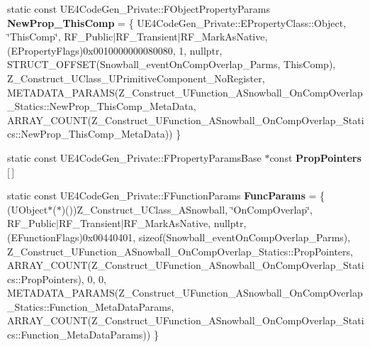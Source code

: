 \begin{DoxyCompactItemize}
\item 
\mbox{\label{struct_z___construct___u_function___a_snowball___on_comp_overlap___statics_aecbc3de91bd2c7678613908aaac420ea}} 
static const U\+E4\+Code\+Gen\+\_\+\+Private\+::\+F\+Object\+Property\+Params {\bfseries New\+Prop\+\_\+\+This\+Comp} = \{ U\+E4\+Code\+Gen\+\_\+\+Private\+::\+E\+Property\+Class\+::\+Object, \char`\"{}This\+Comp\char`\"{}, R\+F\+\_\+\+Public$\vert$R\+F\+\_\+\+Transient$\vert$R\+F\+\_\+\+Mark\+As\+Native, (E\+Property\+Flags)0x0010000000080080, 1, nullptr, S\+T\+R\+U\+C\+T\+\_\+\+O\+F\+F\+S\+E\+T(\+Snowball\+\_\+event\+On\+Comp\+Overlap\+\_\+\+Parms, This\+Comp), Z\+\_\+\+Construct\+\_\+\+U\+Class\+\_\+\+U\+Primitive\+Component\+\_\+\+No\+Register, M\+E\+T\+A\+D\+A\+T\+A\+\_\+\+P\+A\+R\+A\+M\+S(\+Z\+\_\+\+Construct\+\_\+\+U\+Function\+\_\+\+A\+Snowball\+\_\+\+On\+Comp\+Overlap\+\_\+\+Statics\+::\+New\+Prop\+\_\+\+This\+Comp\+\_\+\+Meta\+Data, A\+R\+R\+A\+Y\+\_\+\+C\+O\+U\+N\+T(\+Z\+\_\+\+Construct\+\_\+\+U\+Function\+\_\+\+A\+Snowball\+\_\+\+On\+Comp\+Overlap\+\_\+\+Statics\+::\+New\+Prop\+\_\+\+This\+Comp\+\_\+\+Meta\+Data)) \}
\item 
static const U\+E4\+Code\+Gen\+\_\+\+Private\+::\+F\+Property\+Params\+Base $\ast$const {\bfseries Prop\+Pointers} \mbox{[}$\,$\mbox{]}
\item 
\mbox{\label{struct_z___construct___u_function___a_snowball___on_comp_overlap___statics_ac23490801f5c7512a07109a15fe14a69}} 
static const U\+E4\+Code\+Gen\+\_\+\+Private\+::\+F\+Function\+Params {\bfseries Func\+Params} = \{ (U\+Object$\ast$($\ast$)())Z\+\_\+\+Construct\+\_\+\+U\+Class\+\_\+\+A\+Snowball, \char`\"{}On\+Comp\+Overlap\char`\"{}, R\+F\+\_\+\+Public$\vert$R\+F\+\_\+\+Transient$\vert$R\+F\+\_\+\+Mark\+As\+Native, nullptr, (E\+Function\+Flags)0x00440401, sizeof(\+Snowball\+\_\+event\+On\+Comp\+Overlap\+\_\+\+Parms), Z\+\_\+\+Construct\+\_\+\+U\+Function\+\_\+\+A\+Snowball\+\_\+\+On\+Comp\+Overlap\+\_\+\+Statics\+::\+Prop\+Pointers, A\+R\+R\+A\+Y\+\_\+\+C\+O\+U\+N\+T(\+Z\+\_\+\+Construct\+\_\+\+U\+Function\+\_\+\+A\+Snowball\+\_\+\+On\+Comp\+Overlap\+\_\+\+Statics\+::\+Prop\+Pointers), 0, 0, M\+E\+T\+A\+D\+A\+T\+A\+\_\+\+P\+A\+R\+A\+M\+S(\+Z\+\_\+\+Construct\+\_\+\+U\+Function\+\_\+\+A\+Snowball\+\_\+\+On\+Comp\+Overlap\+\_\+\+Statics\+::\+Function\+\_\+\+Meta\+Data\+Params, A\+R\+R\+A\+Y\+\_\+\+C\+O\+U\+N\+T(\+Z\+\_\+\+Construct\+\_\+\+U\+Function\+\_\+\+A\+Snowball\+\_\+\+On\+Comp\+Overlap\+\_\+\+Statics\+::\+Function\+\_\+\+Meta\+Data\+Params)) \}
\end{DoxyCompactItemize}


